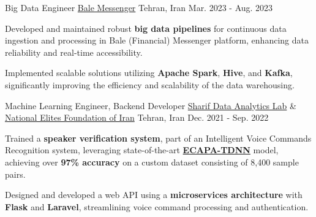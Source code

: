 

\begin{cventries}

  \cventry
    {Big Data Engineer} %
    {\href{https://bale.ai/}{Bale Messenger}} %
    {Tehran, Iran} %
    {Mar. 2023 - Aug. 2023} %
    {
      \begin{cvitems} %
        \item {Developed and maintained robust \textbf{big data pipelines} for continuous data ingestion and processing in Bale (Financial) Messenger platform, enhancing data reliability and real-time accessibility.}
        \item {Implemented scalable solutions utilizing \textbf{Apache Spark}, \textbf{Hive}, and \textbf{Kafka}, significantly improving the efficiency and scalability of the data warehousing.}
      \end{cvitems}
    }


  \cventry
    {Machine Learning Engineer, Backend Developer} %
    {\href{https://www.sharif.edu/}{Sharif Data Analytics Lab} \& \href{https://en.bmn.ir/}{National Elites Foundation of Iran}} %
    {Tehran, Iran} %
    {Dec. 2021 - Sep. 2022} %
    {
      \begin{cvitems} %
        \item{Trained a \textbf{speaker verification system}, part of an Intelligent Voice Commands Recognition system, leveraging state-of-the-art \href{https://arxiv.org/abs/2104.01466}{\textbf{ECAPA-TDNN}} model, achieving over \textbf{97\% accuracy} on a custom dataset consisting of 8,400 sample pairs.}
        \item{Designed and developed a web API using a \textbf{microservices architecture} with \textbf{Flask} and \textbf{Laravel}, streamlining voice command processing and authentication.}
      \end{cvitems}
    }


\end{cventries}

